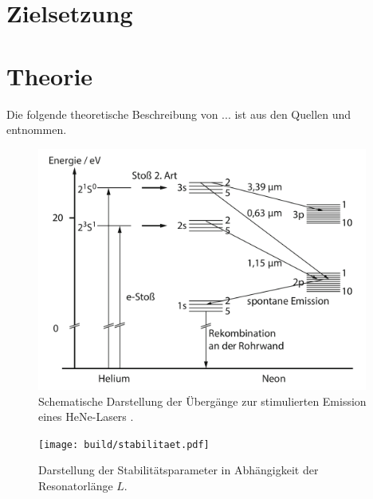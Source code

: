 \section{Zielsetzung}
\label{sec:Zielsetzung}

\section{Theorie}
\label{sec:Theorie}

Die folgende theoretische Beschreibung von ... ist aus den Quellen
\cite{anleitung} und \cite{eichler} entnommen.

\begin{figure}
  \centering
  \includegraphics[height=8cm]{content/HeNe.pdf}
  \caption{Schematische Darstellung der Übergänge zur stimulierten
  Emission eines HeNe-Lasers \cite[68]{eichler}.}
  \label{fig:HeNe}
\end{figure}

\begin{figure}
  \centering
  \texttt{[image: build/stabilitaet.pdf]}
  \caption{Darstellung der Stabilitätsparameter in Abhängigkeit der
  Resonatorlänge $L$.}
  \label{fig:Stabilität}
\end{figure}


